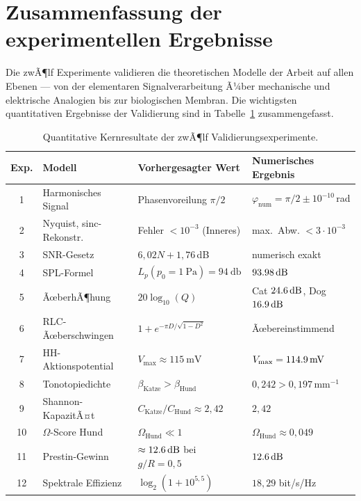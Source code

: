 ﻿\documentclass[12pt,a4paper,titlepage]{report}
\begin{document}
\section{Zusammenfassung der experimentellen Ergebnisse}

Die zwÃ¶lf Experimente validieren die theoretischen Modelle der Arbeit
auf allen Ebenen --- von der elementaren Signalverarbeitung Ã¼ber
mechanische und elektrische Analogien bis zur biologischen Membran.
Die wichtigsten quantitativen Ergebnisse der Validierung sind in
Tabelle~\ref{tab:exp_summary} zusammengefasst.

\begin{table}[H]
\centering
\caption{Quantitative Kernresultate der zwÃ¶lf Validierungsexperimente.}
\label{tab:exp_summary}
\begin{tabular}{clll}
\toprule
\textbf{Exp.} & \textbf{Modell} & \textbf{Vorhergesagter Wert} & \textbf{Numerisches Ergebnis} \\
\midrule
1 & Harmonisches Signal &
  Phasenvoreilung $\pi/2$ &
  $\varphi_{\mathrm{num}} = \pi/2 \pm 10^{-10}$\,rad \\
2 & Nyquist, sinc-Rekonstr. &
  Fehler $< 10^{-3}$ (Inneres) &
  max.\ Abw. $< 3\cdot10^{-3}$ \\
3 & SNR-Gesetz &
  $6{,}02N+1{,}76$\,dB &
  numerisch exakt \\
4 & SPL-Formel &
  $L_p(p_0=\SI{1}{\pascal})=\SI{94}{\decibel}$ &
  $\SI{93{,}98}{\decibel}$ \\
5 & ÃœberhÃ¶hung &
  $20\log_{10}(Q)$ &
  Cat $\SI{24{,}6}{\decibel}$, Dog $\SI{16{,}9}{\decibel}$ \\
6 & RLC-Ãœberschwingen &
  $1+e^{-\pi D/\sqrt{1-D^2}}$ &
  Ãœbereinstimmend \\
7 & HH-Aktionspotential &
  $V_{\max}\approx\SI{115}{\milli\volt}$ &
  $V_{\max}=\SI{114{,}9}{\milli\volt}$ \\
8 & Tonotopiedichte &
  $\beta_{\mathrm{Katze}}>\beta_{\mathrm{Hund}}$ &
  $0{,}242>0{,}197\,\mathrm{mm}^{-1}$ \\
9 & Shannon-KapazitÃ¤t &
  $C_{\mathrm{Katze}}/C_{\mathrm{Hund}}\approx2{,}42$ &
  $2{,}42$ \\
10 & $\Omega$-Score Hund &
  $\Omega_{\mathrm{Hund}}\ll1$ &
  $\Omega_{\mathrm{Hund}}\approx0{,}049$ \\
11 & Prestin-Gewinn &
  $\approx\SI{12{,}6}{\decibel}$ bei $g/R=0{,}5$ &
  $\SI{12{,}6}{\decibel}$ \\
12 & Spektrale Effizienz &
  $\log_2(1+10^{5{,}5})$ &
  $18{,}29$ bit/s/Hz \\
\bottomrule
\end{tabular}
\end{table}
\end{document}

